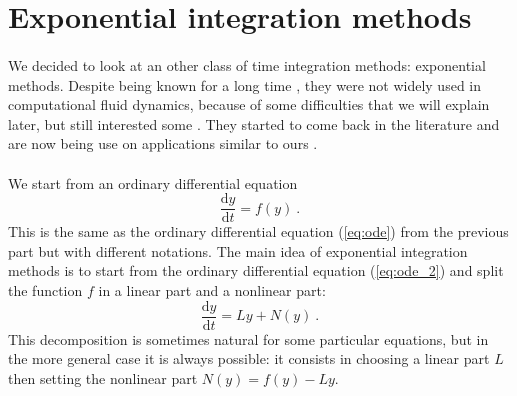   \section{Exponential integration methods}

    \paragraph{}
    We decided to look at an other class of time integration methods: exponential methods.
    Despite being known for a long time \cite{Pope1963}, they were not widely used in computational fluid dynamics, because of some difficulties that we will explain later, but still interested some \cite{EdwardsTuckermanFriesnerEtAl1994}.
    They started to come back in the literature \cite{HochbruckOstermann2005} and are now being use on applications similar to ours \cite{NieZhangZhao2006, BhattKhaliqWade2018}.

    \paragraph{}
    We start from an ordinary differential equation
    \begin{equation}\label{eq:ode_2}
      \frac{\mathrm{d} y}{\mathrm{d} t} = f\left(y\right) \ .
    \end{equation}
    This is the same as the ordinary differential equation (\ref{eq:ode}) from the previous part but with different notations.
    The main idea of exponential integration methods is to start from the ordinary differential equation (\ref{eq:ode_2}) and split the function $f$ in a linear part and a nonlinear part:
    \begin{equation}
      \frac{\mathrm{d} y}{\mathrm{d} t} = Ly + N\left(y\right) \ .
    \end{equation}
    This decomposition is sometimes natural for some particular equations, but in the more general case it is always possible: it consists in choosing a linear part $L$ then setting the nonlinear part $N\left(y\right) = f(y) - Ly$.
